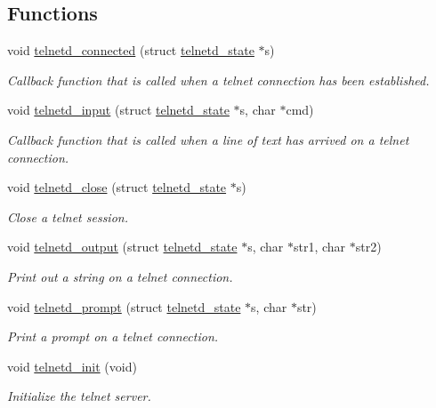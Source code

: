 \subsection*{Functions}
\begin{CompactItemize}
\item 
void \hyperlink{a00081_g992adc34dbe12cd28c2e5cc4c043b461}{telnetd\_\-connected} (struct \hyperlink{a00027}{telnetd\_\-state} $\ast$s)
\begin{CompactList}\small\item\em Callback function that is called when a telnet connection has been established. \item\end{CompactList}\item 
void \hyperlink{a00081_ge639174c3eb987213a3ff0b1e138da26}{telnetd\_\-input} (struct \hyperlink{a00027}{telnetd\_\-state} $\ast$s, char $\ast$cmd)
\begin{CompactList}\small\item\em Callback function that is called when a line of text has arrived on a telnet connection. \item\end{CompactList}\item 
void \hyperlink{a00081_g816bdc3e31e05e0979efe91a697b10ad}{telnetd\_\-close} (struct \hyperlink{a00027}{telnetd\_\-state} $\ast$s)
\begin{CompactList}\small\item\em Close a telnet session. \item\end{CompactList}\item 
void \hyperlink{a00081_g24ecabdebc734cb350bdd766c0cddf1c}{telnetd\_\-output} (struct \hyperlink{a00027}{telnetd\_\-state} $\ast$s, char $\ast$str1, char $\ast$str2)
\begin{CompactList}\small\item\em Print out a string on a telnet connection. \item\end{CompactList}\item 
void \hyperlink{a00081_g8873fd3ee516cfcca82cc4bc67f564c0}{telnetd\_\-prompt} (struct \hyperlink{a00027}{telnetd\_\-state} $\ast$s, char $\ast$str)
\begin{CompactList}\small\item\em Print a prompt on a telnet connection. \item\end{CompactList}\item 
void \hyperlink{a00081_g82ff99d50221f7c17df57dc6092ffc97}{telnetd\_\-init} (void)
\begin{CompactList}\small\item\em Initialize the telnet server. \item\end{CompactList}\end{CompactItemize}
